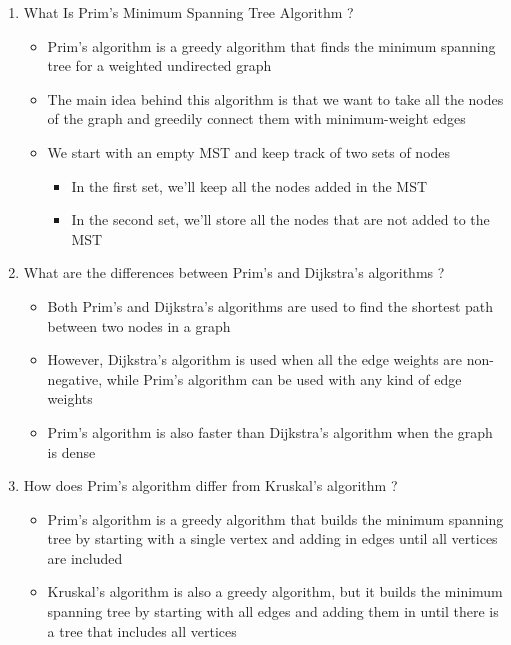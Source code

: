 \begin{enumerate}[label=\arabic*. ]
	\item What Is Prim's Minimum Spanning Tree Algorithm ?
		\begin{itemize}
			\item Prim's algorithm is a greedy algorithm that finds the minimum spanning tree for a
				weighted undirected graph
			\item The main idea behind this algorithm is that we want to take all the nodes of the
				graph and greedily connect them with minimum-weight edges
			\item We start with an empty MST and keep track of two sets of nodes
			\begin{itemize}
				\item In the first set, we'll keep all the nodes added in the MST
				\item In the second set, we'll store all the nodes that are not added to the MST
			\end{itemize}
		\end{itemize}
	
	\item What are the differences between Prim's and Dijkstra's algorithms ?
		\begin{itemize}
			\item Both Prim's and Dijkstra's algorithms are used to find the shortest path between
				two nodes in a graph
			\item However, Dijkstra's algorithm is used when all the edge weights are non-negative,
				while Prim's algorithm can be used with any kind of edge weights
			\item Prim's algorithm is also faster than Dijkstra's algorithm when the graph is dense
		\end{itemize}
	
	\item How does Prim's algorithm differ from Kruskal's algorithm ?
		\begin{itemize}
			\item Prim's algorithm is a greedy algorithm that builds the minimum spanning tree by
				starting with a single vertex and adding in edges until all vertices are
				included
			\item Kruskal's algorithm is also a greedy algorithm, but it builds the minimum
				spanning tree by starting with all edges and adding them in until there is a
				tree that includes all vertices
		\end{itemize}
\end{enumerate}
